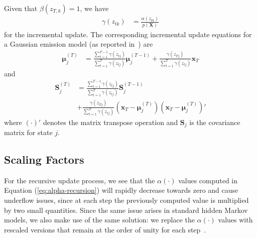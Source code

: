 \documentclass{article}
\begin{document}
Given that $\beta(z_{T,k}) = 1$, we have 
\begin{align}\label{eq:gamma}
    \gamma(z_{tk}) &= \frac{\alpha(z_{tk})}{p(\mathbf{X})}
\end{align}
for the incremental update. The corresponding incremental update equations for a Gaussian emission model (as reported in~\cite{stenger2001}) are 
\begin{align*}
    \mathbf{\mu}_{j}^{(T)} &= \frac{\sum_{t=1}^{T-1}\gamma(z_{tj})}{\sum_{t=1}^{T}\gamma(z_{tj})}\mathbf{\mu}_{j}^{(T-1)} + \frac{\gamma(z_{Tj})}{\sum_{t=1}^{T}\gamma(z_{tj})}\mathbf{x}_T
\end{align*}
and
\begin{align*}
    \mathbf{S}_j^{(T)} &= \frac{\sum_{t=1}^{T-1}\gamma(z_{tj})}{\sum_{t=1}^{T}\gamma(z_{tj})}\mathbf{S}_j^{(T-1)} \\
                       &+ \frac{\gamma(z_{Tj})}{\sum_{t=1}^{T}\gamma(z_{tj})}\left(\mathbf{x}_T - \mathbf{\mu}_j^{(T)}\right)\left(\mathbf{x}_T - \mathbf{\mu}_j^{(T)}\right)'
\end{align*}
where $(\cdot)'$ denotes the matrix transpose operation and $\mathbf{S}_j$ is the covariance matrix for state $j$.

\subsection{Scaling Factors}

For the recursive update process, we see that the $\alpha(\cdot)$ values computed in Equation (\ref{eq:alpha-recursion}) will rapidly decrease towards zero and cause underflow issues, since at each step the previously computed value is multiplied by two small quantities. Since the same issue arises in standard hidden Markov models, we also make use of the same solution: we replace the $\alpha(\cdot)$ values with rescaled versions that remain at the order of unity for each step~\cite{bishop2007patternB}.
\end{document}
